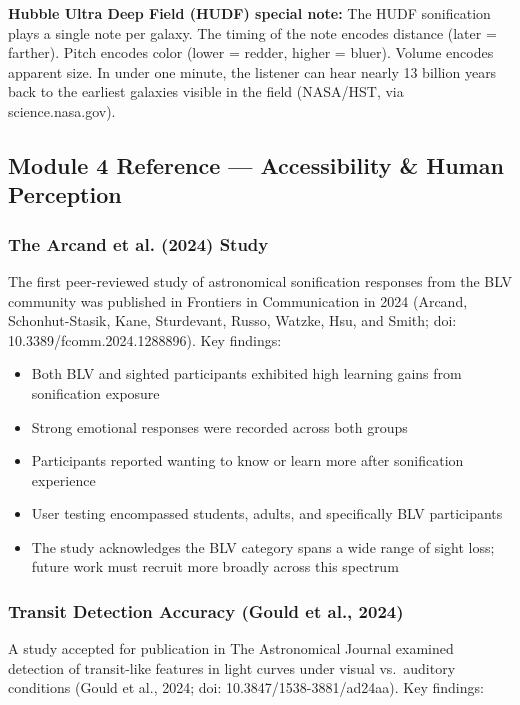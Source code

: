 \documentclass[11pt,letterpaper]{article}
\begin{document}
\textbf{Hubble Ultra Deep Field (HUDF) special note:} The HUDF sonification plays a single note per galaxy. The timing of the note encodes distance (later = farther). Pitch encodes color (lower = redder, higher = bluer). Volume encodes apparent size. In under one minute, the listener can hear nearly 13 billion years back to the earliest galaxies visible in the field (NASA/HST, via science.nasa.gov).

\subsection{Module 4 Reference — Accessibility \& Human Perception}

\subsubsection{The Arcand et al. (2024) Study}

The first peer-reviewed study of astronomical sonification responses from the BLV community was published in Frontiers in Communication in 2024 (Arcand, Schonhut-Stasik, Kane, Sturdevant, Russo, Watzke, Hsu, and Smith; doi: 10.3389/fcomm.2024.1288896). Key findings:

\begin{itemize}
  \item Both BLV and sighted participants exhibited high learning gains from sonification exposure
  \item Strong emotional responses were recorded across both groups
  \item Participants reported wanting to know or learn more after sonification experience
  \item User testing encompassed students, adults, and specifically BLV participants
  \item The study acknowledges the BLV category spans a wide range of sight loss; future work must recruit more broadly across this spectrum
\end{itemize}

\subsubsection{Transit Detection Accuracy (Gould et al., 2024)}

A study accepted for publication in The Astronomical Journal examined detection of transit-like features in light curves under visual vs.\ auditory conditions (Gould et al., 2024; doi: 10.3847/1538-3881/ad24aa). Key findings:
\end{document}
